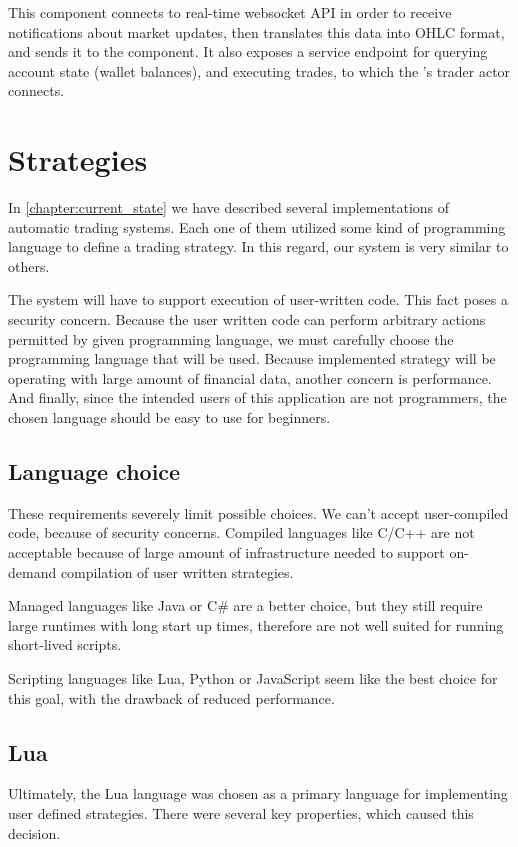 This component connects to real-time websocket API in order to receive notifications about market updates,
then translates this data into OHLC format, and sends it to the  component.
It also exposes a service endpoint for querying account state (wallet balances), and executing trades, to which the
's trader actor connects.

\section{Strategies}
\label{design:eval}
In \autoref{chapter:current_state} we have described several implementations of automatic trading systems. Each one of them
utilized some kind of programming language to define a trading strategy. In this regard, our system is very similar to others.

The system will have to support execution of user-written code. This fact poses a security concern. Because the user
written code can perform arbitrary actions permitted by given programming language, we must carefully choose the programming
language that will be used. Because implemented strategy will be operating with large amount of financial data, another
concern is performance. And finally, since the intended users of this application are not programmers, the chosen language
should be easy to use for beginners.

\subsection{Language choice}
These requirements severely limit possible choices. We can't accept user-compiled code, because of security concerns.
Compiled languages like C/C++ are not acceptable because of large amount of infrastructure needed to support
on-demand compilation of user written strategies.

Managed languages like Java or C\# are a better choice, but they still require large runtimes with long start up times, therefore
are not well suited for running short-lived scripts.

Scripting languages like Lua, Python or JavaScript seem like the best choice for this goal, with the drawback of
reduced performance.

\subsection{Lua}
Ultimately, the Lua language was chosen as a primary language for implementing user defined strategies. There were several
key properties, which caused this decision.

